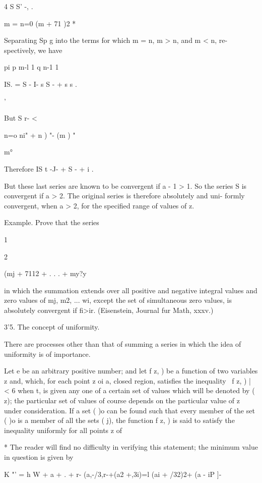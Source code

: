  4 S S' -, .

m = n=0 (m + 71 )2 *

Separating Sp g into the terms for which m = n, m > n, and m < n, re-
spectively, we have

pi p m-l 1 q n-1 1

IS. = S - I- s S - + s s .

'%

But S r- <



n=o ni" + n ) "- (m ) "



m°



Therefore IS t -J- + S - + i .

But these last series are known to be convergent if a - 1 > 1. So the
series S is convergent if a > 2. The original series is therefore
absolutely and uni- formly convergent, when a > 2, for the specified
range of values of z.

Example. Prove that the series

1

2



(mj + 7112 + . . . + my?y

in which the summation extends over all positive and negative integral
values and zero values of mj, m2, ... wi, except the set of
simultaneous zero values, is absolutely convergent if fi>ir.
(Eisenstein, Journal fur Math, xxxv.)

3'5. The concept of uniformity.

There are processes other than that of summing a series in which the
idea of uniformity is of importance.

Let e be an arbitrary positive number; and let f z, ) be a function of
two variables z and, which, for each point z oi a, closed region,
satisfies the inequality \ f z, ) | < 6 when t, is given any one of a
certain set of values which will be denoted by ( z); the particular
set of values of course depends on the particular value of z under
consideration. If a set ( )o can be found such that every member of
the set ( )o is a member of all the sets ( j), the function f z, ) is
said to satisfy the inequality uniformly for all points z of

* The reader will find no difficulty in verifying this statement; the
minimum value in question is given by

K "' = h W + a + . + r- (a,-/3,r-+(a2 +,3i)=l (ai + /32)2+ (a - iP ]-



